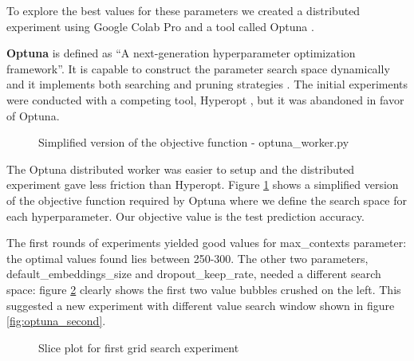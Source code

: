 To explore the best values for these parameters we created a distributed experiment using Google Colab Pro and a tool called Optuna . 

\textbf{Optuna} is defined as ``A next-generation hyperparameter optimization framework''. It is capable to construct the parameter search space dynamically and it implements both searching and pruning strategies \cite{optuna_2019}. The initial experiments were conducted with a competing tool, Hyperopt \cite{bergstra2013making}, but it was abandoned in favor of Optuna.

\begin{figure}
 \centering
 \caption[]{Simplified version of the objective function - optuna\_worker.py}
    \label{fig:optuna_objective}
\end{figure}

The Optuna distributed worker was easier to setup and the distributed experiment gave less friction than Hyperopt. Figure \ref{fig:optuna_objective} shows a simplified version of the objective function required by Optuna where we define the search space for each hyperparameter. Our objective value is the test prediction accuracy.

The first rounds of experiments yielded good values for max\_contexts parameter: the optimal values found lies between 250-300. The other two parameters, default\_embeddings\_size and dropout\_keep\_rate, needed a different search space: figure \ref{fig:optuna_first} clearly shows the first two value bubbles crushed on the left. This suggested a new experiment with different value search window shown in figure \ref{fig:optuna_second}. 

\begin{figure}
 \centering
 \caption[]{Slice plot for first grid search experiment}
    \label{fig:optuna_first}
\end{figure}


